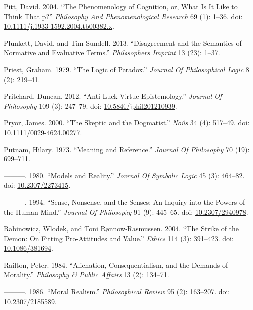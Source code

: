 \documentclass[
  10pt,
  letterpaper,
  DIV=11,
  numbers=noendperiod,
  twoside]{scrartcl}
\newlength{\cslhangindent}
\newenvironment{CSLReferences}[2] %
 {\begin{list}{}{%
  \setlength{\itemindent}{0pt}
  \setlength{\leftmargin}{0pt}
  \setlength{\parsep}{0pt}
  \ifodd #1
   \setlength{\leftmargin}{\cslhangindent}
   \setlength{\itemindent}{-1\cslhangindent}
  \fi
  \setlength{\itemsep}{#2\baselineskip}}}
 {\end{list}}
\begin{document}
\begin{CSLReferences}{1}{0}
Pitt, David. 2004. {``The Phenomenology of Cognition, or, What Is It
Like to Think That p?''} \emph{Philosophy And Phenomenological Research}
69 (1): 1--36. doi:
\href{https://doi.org/10.1111/j.1933-1592.2004.tb00382.x}{10.1111/j.1933-1592.2004.tb00382.x}.

Plunkett, David, and Tim Sundell. 2013. {``Disagreement and the
Semantics of Normative and Evaluative Terms.''} \emph{Philosophers
Imprint} 13 (23): 1--37.

Priest, Graham. 1979. {``The Logic of Paradox.''} \emph{Journal Of
Philosophical Logic} 8 (2): 219--41.

Pritchard, Duncan. 2012. {``Anti-Luck Virtue Epistemology.''}
\emph{Journal Of Philosophy} 109 (3): 247--79. doi:
\href{https://doi.org/10.5840/jphil201210939}{10.5840/jphil201210939}.

Pryor, James. 2000. {``The Skeptic and the Dogmatist.''} \emph{Noûs} 34
(4): 517--49. doi:
\href{https://doi.org/10.1111/0029-4624.00277}{10.1111/0029-4624.00277}.

Putnam, Hilary. 1973. {``Meaning and Reference.''} \emph{Journal Of
Philosophy} 70 (19): 699--711.

---------. 1980. {``Models and Reality.''} \emph{Journal Of Symbolic
Logic} 45 (3): 464--82. doi:
\href{https://doi.org/10.2307/2273415}{10.2307/2273415}.

---------. 1994. {``Sense, Nonsense, and the Senses: An Inquiry into the
Powers of the Human Mind.''} \emph{Journal Of Philosophy} 91 (9):
445--65. doi: \href{https://doi.org/10.2307/2940978}{10.2307/2940978}.

Rabinowicz, Wlodek, and Toni Rønnow‐Rasmussen. 2004. {``The Strike of
the Demon: On Fitting Pro-Attitudes and Value.''} \emph{Ethics} 114 (3):
391--423. doi: \href{https://doi.org/10.1086/381694}{10.1086/381694}.

Railton, Peter. 1984. {``Alienation, Consequentialism, and the Demands
of Morality.''} \emph{Philosophy \& Public Affairs} 13 (2): 134--71.

---------. 1986. {``Moral Realism.''} \emph{Philosophical Review} 95
(2): 163--207. doi:
\href{https://doi.org/10.2307/2185589}{10.2307/2185589}.


\end{CSLReferences}
\end{document}
